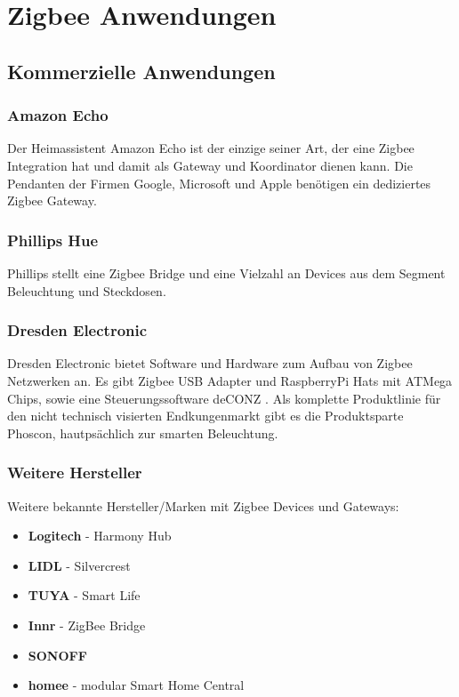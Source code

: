 \section{Zigbee Anwendungen}

\subsection{Kommerzielle Anwendungen}

\subsubsection{Amazon Echo}
    Der Heimassistent Amazon Echo ist der einzige seiner Art, der eine Zigbee Integration hat und damit als Gateway und Koordinator dienen
    kann. Die Pendanten der Firmen Google, Microsoft und Apple benötigen ein dediziertes Zigbee Gateway. \cite{amazonecho} 

\subsubsection{Phillips Hue}
    Phillips stellt eine Zigbee Bridge und eine Vielzahl an Devices aus dem Segment Beleuchtung und Steckdosen.

\subsubsection{Dresden Electronic}
    Dresden Electronic bietet Software und Hardware zum Aufbau von Zigbee Netzwerken an. Es gibt Zigbee USB Adapter und RaspberryPi Hats mit ATMega Chips,
    sowie eine Steuerungssoftware \grqq deCONZ \grqq{}. Als komplette Produktlinie für den nicht technisch visierten Endkungenmarkt gibt es die Produktsparte
    \grqq Phoscon\grqq{}, hautpsächlich zur smarten Beleuchtung.

\subsubsection*{Weitere Hersteller}
Weitere bekannte Hersteller/Marken mit Zigbee Devices und Gateways:
\begin{itemize}
    \item \textbf{Logitech} - Harmony Hub
    \item \textbf{LIDL} - Silvercrest
    \item \textbf{TUYA} - Smart Life
    \item \textbf{Innr} - ZigBee Bridge
    \item \textbf{SONOFF}
    \item \textbf{homee} -  modular Smart Home Central
\end{itemize}

